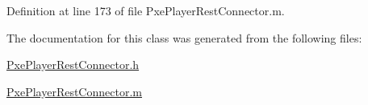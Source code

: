 Definition at line 173 of file Pxe\-Player\-Rest\-Connector.\-m.



The documentation for this class was generated from the following files\-:\begin{DoxyCompactItemize}
\item 
\hyperlink{_pxe_player_rest_connector_8h}{Pxe\-Player\-Rest\-Connector.\-h}\item 
\hyperlink{_pxe_player_rest_connector_8m}{Pxe\-Player\-Rest\-Connector.\-m}\end{DoxyCompactItemize}
